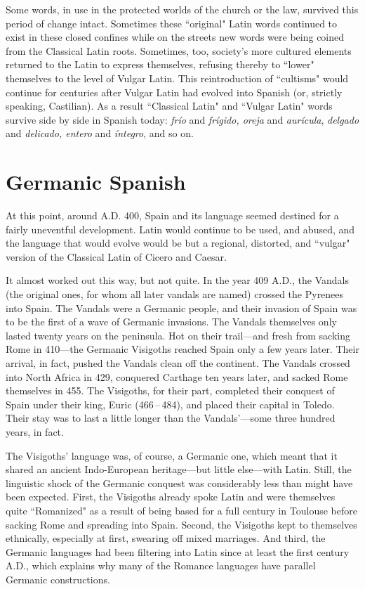 Some words, in use in the protected worlds of the church or
the law, survived this period of change intact. Sometimes these ``original" Latin words continued to exist in these closed confines while
on the streets new words were being coined from the Classical Latin
roots. Sometimes, too, society's more cultured elements returned to
the Latin to express themselves, refusing thereby to ``lower" themselves to the level of Vulgar Latin. This reintroduction of ``cultisms"
would continue for centuries after Vulgar Latin had evolved into Spanish (or, strictly speaking, Castilian). As a result ``Classical Latin" and
``Vulgar Latin" words survive side by side in Spanish today: \emph{frío} and
\emph{frígido, oreja} and \emph{aurícula}, \emph{delgado} and \emph{delicado, entero} and \emph{íntegro}, and so on.

\section{Germanic Spanish}

At this point, around A.D. 400, Spain and its language seemed
destined for a fairly uneventful development. Latin would continue to
be used, and abused, and the language that would evolve would be but
a regional, distorted, and ``vulgar" version of the Classical Latin of
Cicero and Caesar.

It almost worked out this way, but not quite. In the year
409 A.D., the Vandals (the original ones, for whom all later vandals are
named) crossed the Pyrenees into Spain. The Vandals were a Germanic
people, and their invasion of Spain was to be the first of a wave of Germanic invasions. The Vandals themselves only lasted twenty years
on the peninsula. Hot on their trail---and fresh from sacking Rome in
410---the Germanic Visigoths reached Spain only a few years later.
Their arrival, in fact, pushed the Vandals clean off the continent. The
Vandals crossed into North Africa in 429, conquered Carthage ten
years later, and sacked Rome themselves in 455. The Visigoths, for
their part, completed their conquest of Spain under their king, Euric
(466\,--\,484), and placed their capital in Toledo. Their stay was to last a
little longer than the Vandals'---some three hundred years, in fact.

The Visigoths' language was, of course, a Germanic one,
which meant that it shared an ancient Indo-European heritage---but
little else---with Latin. Still, the linguistic shock of the Germanic conquest was considerably less than might have been expected. First, the
Visigoths already spoke Latin and were themselves quite ``Romanized"
as a result of being based for a full century in Toulouse before sacking
Rome and spreading into Spain. Second, the Visigoths kept to themselves ethnically, especially at first, swearing off mixed marriages. And
third, the Germanic languages had been filtering into Latin since at
least the first century A.D., which explains why many of the Romance
languages have parallel Germanic constructions.

